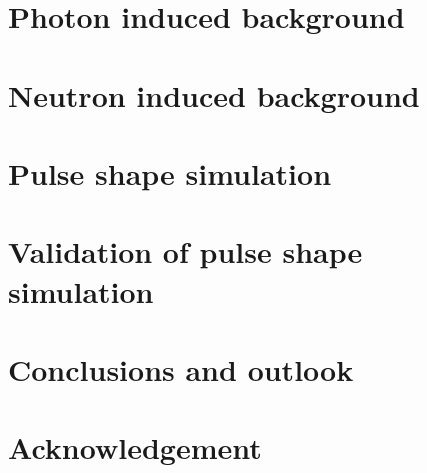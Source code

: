 \documentclass[11pt,a4paper]{book}
\begin{document}
\chapter{Photon induced background}
\label{cha:photon}


\chapter{Neutron induced background}
\label{cha:neutron}


\chapter{Pulse shape simulation}
\label{cha:pss}

\clearpage{\pagestyle{empty}\cleardoublepage}

\chapter{Validation of pulse shape simulation}
\label{cha:psa}


\chapter{Conclusions and outlook}
\label{cha:con}

\clearpage{\pagestyle{empty}\cleardoublepage}

\chapter*{Acknowledgement}
\label{cha:ack}
 
\clearpage{\pagestyle{empty}\cleardoublepage}


\end{document}
